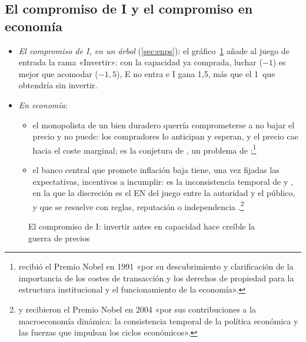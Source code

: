 \documentclass[11pt]{article}
\begin{document}
\subsection*{El compromiso de \textup{I} y el compromiso en economía}\label{anexo:compromiso}

\begin{itemize}
\item \emph{El compromiso de \textup{I}, en un árbol} (\ref{sec:enps}): el gráfico~\ref{fig:juego-entrada-compromiso} añade al juego de entrada la rama «Invertir»: con la capacidad ya comprada, luchar ($-1$) es mejor que acomodar ($-1{,}5$), E no entra e \textup{I} gana 1,5, más que el 1~que obtendría sin invertir.
\item \emph{En economía}:
  \begin{itemize}
  \item el monopolista de un bien duradero querría comprometerse a no bajar el precio y no puede: los compradores lo anticipan y esperan, y el precio cae hacia el coste marginal; es la conjetura de \textcite{Coase1972Durability}, un problema de  ;\footnote{ recibió el Premio Nobel en 1991 «por su descubrimiento y clarificación de la importancia de los costes de transacción y los derechos de propiedad para la estructura institucional y el funcionamiento de la economía»\nocite{Nobel1991Coase}.}
  \item el banco central que promete inflación baja tiene, una vez fijadas las expectativas, incentivos a incumplir: es la inconsistencia temporal de \textcite{KydlandPrescott1977Rules} y \textcite{BarroGordon1983Rules}, en la que la discreción es el EN del juego entre la autoridad y el público, y que se resuelve con reglas, reputación o independencia .\footnote{ y  recibieron el Premio Nobel en 2004 «por sus contribuciones a la macroeconomía dinámica: la consistencia temporal de la política económica y las fuerzas que impulsan los ciclos económicos»\nocite{Nobel2004KydlandPrescott}.}
  \end{itemize}
\end{itemize}

\begin{figure}[H]
\centering
\caption{El compromiso de \textup{I}: invertir antes en capacidad hace creíble la guerra de precios}\label{fig:juego-entrada-compromiso}
\end{figure}
\end{document}
